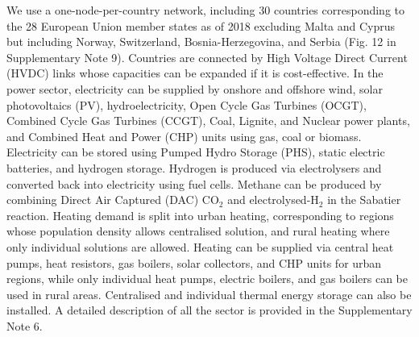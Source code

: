 \documentclass[5p]{elsarticle} %
\begin{document}
We use a one-node-per-country network, including 30 countries corresponding to the 28 European Union member states as of 2018 excluding Malta and Cyprus but including Norway, Switzerland, Bosnia-Herzegovina, and Serbia (\textcolor[rgb]{1,0,0}{Fig. 12 in Supplementary Note 9}). Countries are connected by High Voltage Direct Current (HVDC) links whose capacities can be expanded if it is cost-effective. In the power sector, electricity can be supplied by onshore and offshore wind, solar photovoltaics (PV), hydroelectricity, Open Cycle Gas Turbines (OCGT), Combined Cycle Gas Turbines (CCGT), Coal, Lignite, and Nuclear power plants, and Combined Heat and Power (CHP) units using gas, coal or biomass. Electricity can be stored using Pumped Hydro Storage (PHS), static electric batteries, and hydrogen storage. Hydrogen is produced via electrolysers and converted back into electricity using fuel cells. Methane can be produced by combining Direct Air Captured (DAC) CO$_2$ and electrolysed-H$_2$ in the Sabatier reaction. Heating demand is split into urban heating, corresponding to regions whose population density allows centralised solution, and rural heating where only individual solutions are allowed. Heating can be supplied via central heat pumps, heat resistors, gas boilers, solar collectors, and CHP units for urban regions, while only individual heat pumps, electric boilers, and gas boilers can be used in rural areas. Centralised and individual thermal energy storage can also be installed. A detailed description of all the sector is provided in the Supplementary Note 6. \

\end{document}
